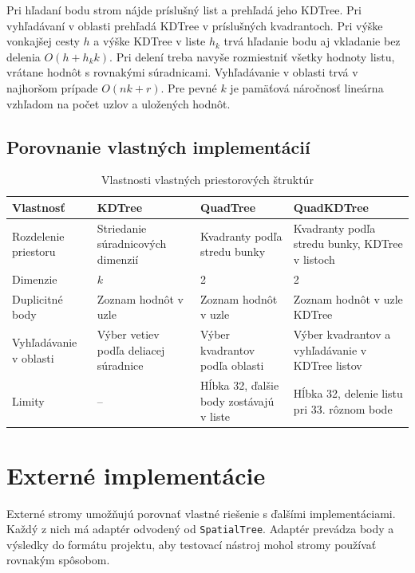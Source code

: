\documentclass[12pt,a4paper,oneside]{report}
\begin{document}
Pri hľadaní bodu strom nájde príslušný list a prehľadá jeho KDTree.
Pri vyhľadávaní v oblasti prehľadá KDTree v príslušných kvadrantoch.
Pri výške vonkajšej cesty \(h\) a výške KDTree v liste \(h_k\) trvá
hľadanie bodu aj vkladanie bez delenia \(O(h+h_k k)\). Pri delení treba
navyše rozmiestniť všetky hodnoty listu, vrátane hodnôt s rovnakými
súradnicami. Vyhľadávanie v oblasti trvá v najhoršom prípade \(O(nk+r)\).
Pre pevné \(k\) je pamäťová náročnosť lineárna vzhľadom na počet uzlov
a uložených hodnôt.

\section{Porovnanie vlastných implementácií}
\begin{table}[H]
\centering
\small
\begin{tabularx}{\textwidth}{@{}p{2.6cm}XXX@{}}
\toprule
\textbf{Vlastnosť} & \textbf{KDTree} & \textbf{QuadTree} & \textbf{QuadKDTree}\\
\midrule
Rozdelenie priestoru & Striedanie súradnicových dimenzií & Kvadranty podľa stredu bunky & Kvadranty podľa stredu bunky, KDTree v listoch\\
Dimenzie & \(k\) & 2 & 2\\
Duplicitné body & Zoznam hodnôt v uzle & Zoznam hodnôt v uzle & Zoznam hodnôt v uzle KDTree\\
Vyhľadávanie v oblasti & Výber vetiev podľa deliacej súradnice & Výber kvadrantov podľa oblasti & Výber kvadrantov a vyhľadávanie v KDTree listov\\
Limity & -- & Hĺbka 32, ďalšie body zostávajú v liste & Hĺbka 32, delenie listu pri 33. rôznom bode\\
\bottomrule
\end{tabularx}
\caption{Vlastnosti vlastných priestorových štruktúr}
\label{tab:own-trees}
\end{table}

\chapter{Externé implementácie}
\label{chap:external}

Externé stromy umožňujú porovnať vlastné riešenie s ďalšími
implementáciami. Každý z nich má adaptér odvodený od \texttt{SpatialTree}.
Adaptér prevádza body a výsledky do formátu projektu, aby testovací
nástroj mohol stromy používať rovnakým spôsobom.
\end{document}
